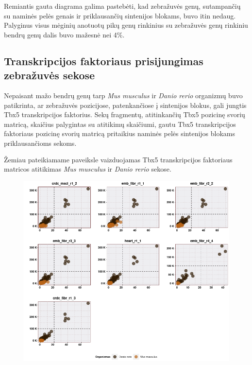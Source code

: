 \documentclass[12pt]{article}
\begin{document}
Remiantis gauta diagrama galima pastebėti, kad zebražuvės genų, sutampančių su
naminės pelės genais ir priklausančių sintenijos blokams, buvo itin nedaug.
Palyginus visus mėginių anotuotų pikų genų rinkinius su zebražuvės genų rinkiniu
bendrų genų dalis buvo mažesnė nei 4\%.

\subsection{Transkripcijos faktoriaus prisijungimas zebražuvės sekose}
Nepaisant mažo bendrų genų tarp \emph{Mus musculus} ir \emph{Danio rerio}
organizmų buvo patikrinta, ar zebražuvės pozicijose, patenkančiose į sintenijos
blokus, gali jungtis Tbx5 transkripcijos faktorius. Sekų fragmentų,
atitinkančių Tbx5 pozicinę svorių matricą, skaičius palygintas su atitikimų
skaičiumi, gautu Tbx5 transkripcijos faktoriaus pozicinę svorių matricą
pritaikius naminės pelės sintenijos blokams priklausančioms sekoms.

Žemiau pateikiamame paveiksle vaizduojamas Tbx5 transkripcijos faktoriaus
matricos atitikimas \emph{Mus musculus} ir \emph{Danio rerio} sekose.


\begin{figure}[htb]
    \begin{center}
        \includegraphics[width=0.8\linewidth]{../Figures/PWM_matches_all.png}
        \vspace{-2\baselineskip}
        \caption*{\small\textbf{}}
        \label{fig:birds}
    \end{center}
\end{figure}
\end{document}
